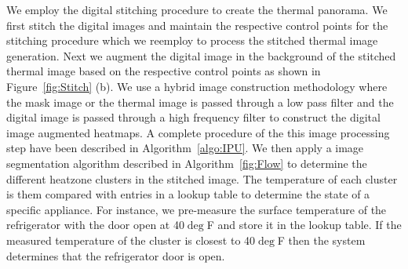 
We employ the digital stitching procedure to create the thermal panorama. We first stitch the digital images and maintain the respective control points for the stitching procedure which we reemploy to process the stitched thermal image generation. Next we augment the digital image in the background of the stitched thermal image based on the respective control points as shown in Figure~\ref{fig:Stitch} (b). We use a hybrid image construction methodology where the mask image or the thermal image is passed through a low pass filter and the digital image is passed through a high frequency filter to construct the digital image augmented heatmaps. A complete procedure of the this image processing step have been described in Algorithm~\ref{algo:IPU}. We then apply a image segmentation algorithm described in Algorithm~\ref{fig:Flow} to determine the different heatzone
clusters in the stitched image. The temperature of each cluster is them compared with entries in a lookup table to determine the state of
a specific appliance. For instance, we pre-measure the surface temperature of the refrigerator with the door open at 40$\deg$F and store it in the lookup table. If the measured temperature of the cluster is closest to 40$\deg$F then the system determines that the refrigerator door is open.


